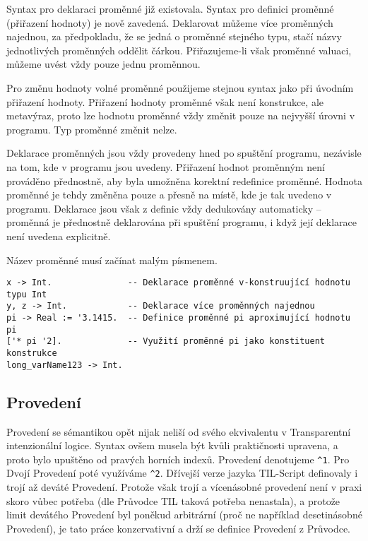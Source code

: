 
Syntax pro deklaraci proměnné již existovala. Syntax pro definici proměnné (přiřazení hodnoty)
je nově zavedená. Deklarovat můžeme více proměnných najednou, za předpokladu, že se jedná o
proměnné stejného typu, stačí názvy jednotlivých proměnných oddělit čárkou. Přiřazujeme-li však
proměnné valuaci, můžeme uvést vždy pouze jednu proměnnou.

Pro změnu hodnoty volné proměnné použijeme stejnou syntax jako při úvodním přiřazení hodnoty.
Přiřazení hodnoty proměnné však není konstrukce, ale metavýraz, proto lze hodnotu proměnné vždy
změnit pouze na nejvyšší úrovni v programu. Typ proměnné změnit nelze.

Deklarace proměnných jsou vždy provedeny hned po spuštění programu, nezávisle na tom, kde v programu
jsou uvedeny. Přiřazení hodnot proměnným není prováděno přednostně, aby byla umožněna korektní
redefinice proměnné. Hodnota proměnné je tehdy změněna pouze a přesně na místě, kde je tak uvedeno
v programu. Deklarace jsou však z definic vždy dedukovány automaticky -- proměnná je přednostně
deklarována při spuštění programu, i když její deklarace není uvedena explicitně.

Název proměnné musí začínat malým písmenem. 

\begin{lstlisting}[caption={Příklad využití proměnných}]
x -> Int.               -- Deklarace proměnné v-konstruující hodnotu typu Int
y, z -> Int.            -- Deklarace více proměnných najednou
pi -> Real := '3.1415.  -- Definice proměnné pi aproximující hodnotu pi
['* pi '2].             -- Využití proměnné pi jako konstituent konstrukce
long_varName123 -> Int.
\end{lstlisting}

\subsection{Provedení}

Provedení se sémantikou opět nijak neliší od svého ekvivalentu v Transparentní intenzionální
logice. Syntax ovšem musela být kvůli praktičnosti upravena, a proto bylo upuštěno od pravých
horních indexů. Provedení denotujeme \lstinline{^1}. Pro Dvojí Provedení poté využíváme
\lstinline{^2}. Dřívejší verze jazyka TIL-Script definovaly i trojí až deváté Provedení. Protože
však trojí a vícenásobné provedení není v praxi skoro vůbec potřeba (dle Průvodce TIL taková potřeba
nenastala), a protože limit devátého Provedení byl poněkud arbitrární (proč ne například
desetinásobné Provedení), je tato práce konzervativní a drží se definice Provedení z Průvodce.

